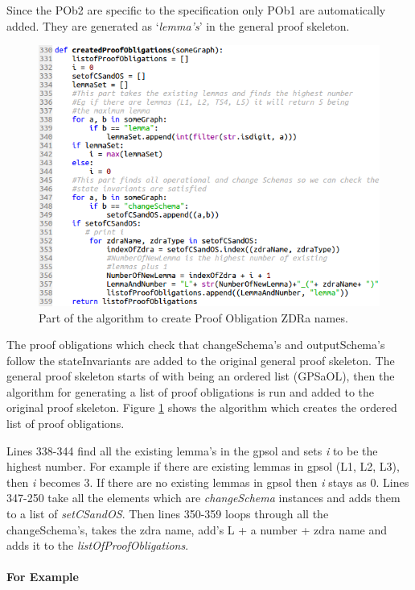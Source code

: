 Since the POb2 are specific to the specification only POb1 are automatically added. They are generated as `\emph{lemma's}' in the general proof skeleton. 

\begin{figure}[H]
\includegraphics[scale=0.6]{Figures/skeleton/pobcode.png}
\caption{Part of the algorithm to create Proof Obligation ZDRa names.}
\label{fig:codepob}
\end{figure}

The proof obligations which check that changeSchema's and outputSchema's follow the stateInvariants are added to the original general proof skeleton. The general proof skeleton starts of with being an ordered list (GPSaOL), then the algorithm for generating a list of proof obligations is run and added to the original proof skeleton. Figure \ref{fig:codepob} shows the algorithm which creates the ordered list of proof obligations.

Lines 338-344 find all the existing lemma's in the \gls{gpsol} and sets \emph{i} to be the highest number. For example if there are existing lemmas in \gls{gpsol} (L1, L2, L3), then \emph{i} becomes 3. If there are no existing lemmas in \gls{gpsol} then \emph{i} stays as 0. Lines 347-250 take all the elements which are \emph{changeSchema} instances and adds them to a list of \emph{setCSandOS}. Then lines 350-359 loops through all the changeSchema's, takes the \gls{zdra} name, add's L + a number + \gls{zdra} name and adds it to the \emph{listOfProofObligations}.

\paragraph{For Example}


